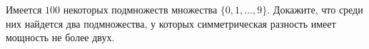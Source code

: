 \documentclass{article}
\begin{document}
Имеется $100$ некоторых подмножеств множества $\{0,1, \ldots, 9\}$. Докажите, что среди них найдется два подмножества, 
у которых симметрическая разность имеет мощность не более двух.
\end{document}
